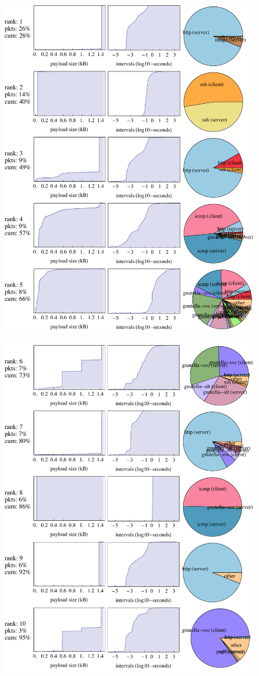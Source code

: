 \documentclass[twocolumn,final]{svjour3}
\begin{document}
\begin{figure}
{\includegraphics[height=5.95in]{plots/basic_behaviors_1.pdf}}\hfill%
{\includegraphics[height=5.95in]{plots/basic_behaviors_2.pdf}}

\end{figure}
\end{document}
